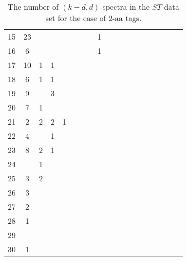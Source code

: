 \documentclass{article}
\begin{document}
\begin{table}[h]
{\begin{tabular}{|c|c|
c|c|c|c|c|c|c|c|c|c|c|c|c|c|c|c|c|}
15  & 23 &  &  &  &  &  &  & 1 &  &  &  &  &  &  &  &  &  & \\

16  & 6 &  &  &  &  &  &  & 1 &  &  &  &  &  &  &  &  &  & \\

17  & 10 & 1 & 1 &  &  &  &  &  &  &  &  &  &  &  &  &  &  & \\

18  & 6 & 1 & 1 &  &  &  &  &  &  &  &  &  &  &  &  &  &  & \\

19  & 9 &  & 3 &  &  &  &  &  &  &  &  &  &  &  &  &  &  & \\

20  & 7 & 1 &  &  &  &  &  &  &  &  &  &  &  &  &  &  &  & \\

21  & 2 & 2 & 2 & 1 &  &  &  &  &  &  &  &  &  &  &  &  &  & \\

22  & 4 &  & 1 &  &  &  &  &  &  &  &  &  &  &  &  &  &  & \\

23  & 8 & 2 & 1 &  &  &  &  &  &  &  &  &  &  &  &  &  &  & \\

24  &  & 1 &  &  &  &  &  &  &  &  &  &  &  &  &  &  &  & \\

25  & 3 & 2 &  &  &  &  &  &  &  &  &  &  &  &  &  &  &  & \\

26  & 3 &  &  &  &  &  &  &  &  &  &  &  &  &  &  &  &  & \\

27  & 2 &  &  &  &  &  &  &  &  &  &  &  &  &  &  &  &  & \\

28  & 1 &  &  &  &  &  &  &  &  &  &  &  &  &  &  &  &  & \\

29  &  &  &  &  &  &  &  &  &  &  &  &  &  &  &  &  &  & \\

30  & 1 &  &  &  &  &  &  &  &  &  &  &  &  &  &  &  &  & \\

  \hline
\end{tabular}
\par}
\centering
\caption{The number of $(k-d,d)$-spectra in the $ST$ data set for the case of 2-aa tags.}
\vspace{3mm}
\label{table:kd-1-ST}
\end{table}
\end{document}
